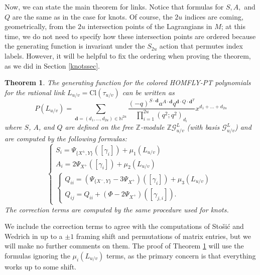 \documentclass[11pt]{amsart}
\theoremstyle{plain}
\newtheorem{theoremN}{Theorem}[section]
\theoremstyle{definition}
\theoremstyle{remark}
\begin{document}
Now, we can state the main theorem for links. Notice that formulas for $S,A,$ and $Q$ are the same as in the case for knots. Of course, the $2u$ indices are coming, geometrically, from the $2u$ intersection points of the Lagrangians in $M$; at this time, we do not need to specify how these intersection points are ordered because the generating function is invariant under the $S_{2u}$ action that permutes index labels. However, it will be helpful to fix the ordering when proving the theorem, as we did in Section \ref{knotssec}.

\begin{theoremN}
\label{Linkthm}
    The generating function for the colored HOMFLY-PT polynomials for the rational link $L_{u/v}=\text{Cl}(\tau_{u/v})$ can be written as
    \begin{equation}
        P(L_{u/v})=\sum_{\textbf{d}=(d_1,...,d_{2u})\in \mathbb{N}^{2u}} \frac{(-q)^{S\cdot \textbf{d}}a^{A\cdot \textbf{d}}q^{\textbf{d}\cdot Q \cdot\textbf{d}^T}}{\prod_{i=1}^{2u}(q^2;q^2)_{d_i}}x^{d_1+...+d_{2u}}
    \end{equation}
    where $S$, $A$, and $Q$ are defined on the free $\mathbb{Z}$-module $\mathbb{Z}\mathcal{G}_{u/v}^L$ (with basis $\mathcal{G}_{u/v}^L$) and are computed by the following formulas:
    \[
    \begin{cases}
        S_i=\Psi_{\{X^\pm,Y\}}([\gamma_i])+\mu_1(L_{u/v})\\
        A_i=2\Psi_{X^+}([\gamma_i])+\mu_2(L_{u/v})\\
        \begin{cases}
            Q_{ii}=(\Psi_{\{X^-,Y\}}-3\Psi_{X^+})([\gamma_i])+\mu_3(L_{u/v})\\
            Q_{ij}=Q_{ii}+(\Phi-2\Psi_{X^+})([\gamma_{j,i}]).
        \end{cases}
    \end{cases}
    \]
    The correction terms are computed by the same procedure used for knots.
\end{theoremN}

We include the correction terms to agree with the computations of Sto\v si\'c and Wedrich in \cite{SW21} up to a $\pm 1$ framing shift and permutations of matrix entries, but we will make no further comments on them. The proof of Theorem \ref{Linkthm} will use the formulas ignoring the $\mu_i(L_{u/v})$ terms, as the primary concern is that everything works up to some shift.
\end{document}
